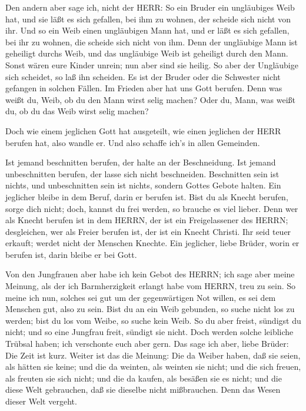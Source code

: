  Den andern aber sage ich, nicht der HERR: So ein Bruder
ein ungläubiges Weib hat, und sie läßt es sich gefallen, bei ihm zu
wohnen, der scheide sich nicht von ihr.  Und so ein Weib
einen ungläubigen Mann hat, und er läßt es sich gefallen, bei ihr zu
wohnen, die scheide sich nicht von ihm.  Denn der
ungläubige Mann ist geheiligt durchs Weib, und das ungläubige Weib ist
geheiligt durch den Mann. Sonst wären eure Kinder unrein; nun aber sind
sie heilig.  So aber der Ungläubige sich scheidet, so laß
ihn scheiden. Es ist der Bruder oder die Schwester nicht gefangen in
solchen Fällen. Im Frieden aber hat uns Gott berufen.  Denn
was weißt du, Weib, ob du den Mann wirst selig machen? Oder du, Mann,
was weißt du, ob du das Weib wirst selig machen?

 Doch wie einem jeglichen Gott hat ausgeteilt, wie einen
jeglichen der HERR berufen hat, also wandle er. Und also schaffe ich's
in allen Gemeinden.

 Ist jemand beschnitten berufen, der halte an der
Beschneidung. Ist jemand unbeschnitten berufen, der lasse sich nicht
beschneiden.  Beschnitten sein ist nichts, und
unbeschnitten sein ist nichts, sondern Gottes Gebote halten.
 Ein jeglicher bleibe in dem Beruf, darin er berufen ist.
 Bist du als Knecht berufen, sorge dich nicht; doch, kannst
du frei werden, so brauche es viel lieber.  Denn wer als
Knecht berufen ist in dem HERRN, der ist ein Freigelassener des HERRN;
desgleichen, wer als Freier berufen ist, der ist ein Knecht Christi.
 Ihr seid teuer erkauft; werdet nicht der Menschen Knechte.
 Ein jeglicher, liebe Brüder, worin er berufen ist, darin
bleibe er bei Gott.

 Von den Jungfrauen aber habe ich kein Gebot des HERRN; ich
sage aber meine Meinung, als der ich Barmherzigkeit erlangt habe vom
HERRN, treu zu sein.  So meine ich nun, solches sei gut um
der gegenwärtigen Not willen, es sei dem Menschen gut, also zu sein.
 Bist du an ein Weib gebunden, so suche nicht los zu
werden; bist du los vom Weibe, so suche kein Weib.  So du
aber freist, sündigst du nicht; und so eine Jungfrau freit, sündigt sie
nicht. Doch werden solche leibliche Trübsal haben; ich verschonte euch
aber gern.  Das sage ich aber, liebe Brüder: Die Zeit ist
kurz. Weiter ist das die Meinung: Die da Weiber haben, daß sie seien,
als hätten sie keine; und die da weinten, als weinten sie nicht;
 und die sich freuen, als freuten sie sich nicht; und die
da kaufen, als besäßen sie es nicht;  und die diese Welt
gebrauchen, daß sie dieselbe nicht mißbrauchen. Denn das Wesen dieser
Welt vergeht.

